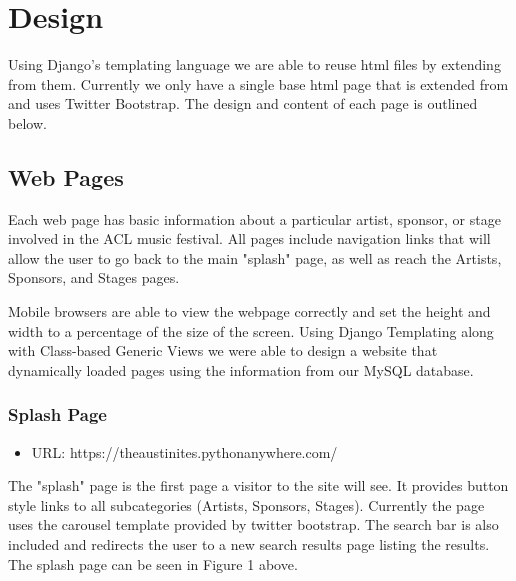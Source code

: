 \documentclass[12pt,english]{scrartcl}
\begin{document}
\section{Design}

Using Django's templating language we are able to reuse html files by extending from them. Currently we only have a single base html page that is extended from and 
uses Twitter Bootstrap. The design and content of each page is outlined below.

\subsection{Web Pages}
Each web page has basic information about a particular artist, sponsor, or stage involved in the ACL music festival.
All pages include navigation links that will allow the user to go back to the main "splash" page, as well as reach the Artists, Sponsors, and
Stages pages. 

Mobile browsers are able to view the webpage correctly and set the height and width to a percentage of the size of the screen.
Using Django Templating along with Class-based Generic Views we were able to design a website that dynamically loaded pages using the information from our MySQL database.

\subsubsection{Splash Page}
\begin{itemize}
 \item URL: https://theaustinites.pythonanywhere.com/
\end{itemize}

The "splash" page is the first page a visitor to the site will see. It provides button style links to all subcategories (Artists,
Sponsors, Stages). Currently the page uses the carousel template provided by twitter bootstrap. The search bar is also included
and redirects the user to a new search results page listing the results. The splash page can be seen in Figure 1 above.
\end{document}
